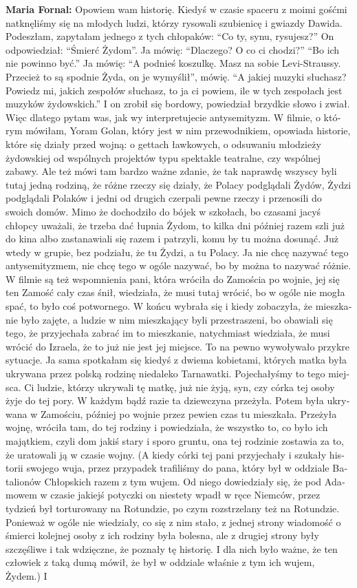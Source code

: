 \begin{otherlanguage}{ngerman}
\textbf{Maria Fornal:} Opowiem wam historię. Kiedyś w czasie spaceru z moimi gośćmi natknęliśmy się na młodych ludzi, którzy rysowali szubienicę i gwiazdy Dawida. Podeszłam, zapytałam jednego z tych chłopaków: "`Co ty, synu, rysujesz?"' On odpowiedział: "`Śmierć Żydom"'. Ja mówię: "`Dlaczego? O co ci chodzi?"' "`Bo ich nie powinno być."' Ja mówię: "`A podnieś koszulkę. Masz na sobie Levi-Straussy. Przecież to są spodnie Żyda, on je wymyślił"', mówię. "`A jakiej muzyki słuchasz? Powiedz mi, jakich zespołów słuchasz, to ja ci powiem, ile w tych zespołach jest muzyków żydowskich."' I on zrobił się bordowy, powiedział brzydkie słowo i zwiał. Więc dlatego pytam was, jak wy interpretujecie antysemityzm. W filmie, o którym mówiłam, Yoram Golan, który jest w nim przewodnikiem, opowiada historie, które się działy przed wojną: o gettach ławkowych, o odsuwaniu młodzieży żydowskiej od wspólnych projektów typu spektakle teatralne, czy wspólnej zabawy. Ale też mówi tam bardzo ważne zdanie, że tak naprawdę wszyscy byli tutaj jedną rodziną, że różne rzeczy się działy, że Polacy podglądali Żydów, Żydzi podglądali Polaków i jedni od drugich czerpali pewne rzeczy i przenosili do swoich domów. Mimo że dochodziło do bójek w szkołach, bo czasami jacyś chłopcy uważali, że trzeba dać łupnia Żydom, to kilka dni później razem szli już do kina albo zastanawiali się razem i patrzyli, komu by tu można dosunąć. Już wtedy w grupie, bez podziału, że tu Żydzi, a tu Polacy. Ja nie chcę nazywać tego antysemityzmem, nie chcę tego w ogóle nazywać, bo by można to nazywać różnie. W filmie są też wspomnienia pani, która wróciła do Zamościa po wojnie, jej się ten Zamość cały czas śnił, wiedziała, że musi tutaj wrócić, bo w ogóle nie mogła spać, to było coś potwornego. W końcu wybrała się i kiedy zobaczyła, że mieszkanie było zajęte, a ludzie w nim mieszkający byli przestraszeni, bo obawiali się tego, że przyjechała zabrać im to mieszkanie, natychmiast wiedziała, że musi wrócić do Izraela, że to już nie jest jej miejsce. To na pewno wywoływało przykre sytuacje. Ja sama spotkałam się kiedyś z dwiema kobietami, których matka była ukrywana przez polską rodzinę niedaleko Tarnawatki. Pojechałyśmy to tego miejsca. Ci ludzie, którzy ukrywali tę matkę, już nie żyją, syn, czy córka tej osoby żyje do tej pory. W każdym bądź razie ta dziewczyna przeżyła. Potem była ukrywana w Zamościu, później po wojnie przez pewien czas tu mieszkała. Przeżyła wojnę, wróciła tam, do tej rodziny i powiedziała, że wszystko to, co było ich majątkiem, czyli dom jakiś stary i sporo gruntu, ona tej rodzinie zostawia za to, że uratowali ją w czasie wojny. (A kiedy córki tej pani przyjechały i szukały historii swojego wuja, przez przypadek trafiliśmy do pana, który był w oddziale Batalionów Chłopskich razem z tym wujem. Od niego dowiedziały się, że pod Adamowem w czasie jakiejś potyczki on niestety wpadł w ręce Niemców, przez tydzień był torturowany na Rotundzie, po czym rozstrzelany też na Rotundzie. Ponieważ w ogóle nie wiedziały, co się z nim stało, z jednej strony wiadomość o śmierci kolejnej osoby z ich rodziny była bolesna, ale z drugiej strony były szczęśliwe i tak wdzięczne, że poznały tę historię. I dla nich było ważne, że ten człowiek z taką dumą mówił, że był w oddziale właśnie z tym ich wujem, Żydem.) I 
\end{otherlanguage}
